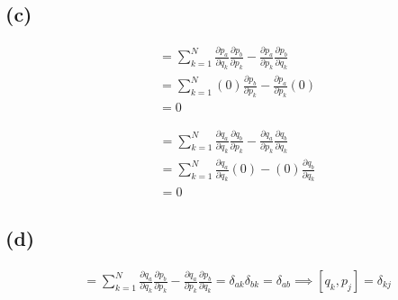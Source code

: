\documentclass[letter, 10pts]{article}
\begin{document}
\subsection*{(c)}
\begin{minipage}{0.5\textwidth}
\begin{align*}
	[p_a, p_b] 
	&= 
	\sum_{k = 1}^{N} 
	\frac{\partial p_a}{\partial q_k} 
	\frac{\partial p_b}{\partial p_k} - 
	\frac{\partial p_a}{\partial p_k}
	\frac{\partial p_b}{\partial q_k}\\
	&= 
	\sum_{k = 1}^{N} 
	(0)\frac{\partial p_b}{\partial p_k} - 
	\frac{\partial p_a}{\partial p_k}
	(0) \\ 
	&= 0 \end{align*} \end{minipage} \hfill
\begin{minipage}{0.5\textwidth} 
	\begin{align*}
	[q_a, q_b] 
	&= 
	\sum_{k = 1}^{N} 
	\frac{\partial q_a}{\partial q_k} 
	\frac{\partial q_b}{\partial p_k} - 
	\frac{\partial q_a}{\partial p_k}
	\frac{\partial q_b}{\partial q_k}\\
	&= 
	\sum_{k = 1}^{N} 
	\frac{\partial q_a}{\partial q_k} 
	(0) - 
	(0) \frac{\partial q_b}{\partial q_k}\\
	&= 0 
\end{align*}
\end{minipage}




\subsection*{(d)}
\begin{align*}
	[q_a, p_b] &= 
	\sum_{k = 1}^{N} 
	\frac{\partial q_a}{\partial q_k} 
	\frac{\partial p_b}{\partial p_k} - 
	\frac{\partial q_a}{\partial p_k}
	\frac{\partial p_b}{\partial q_k} =
	\delta_{ak} \delta_{bk} = \delta_{ab} \implies
	[q_k, p_j] = \delta_{kj}
\end{align*}
 
\end{document}
